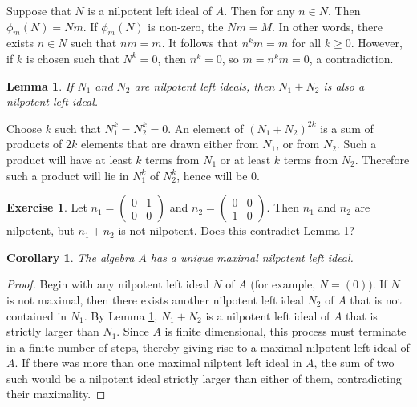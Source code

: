 \documentclass[
]{book}
\newtheorem{lemma}{Lemma}[chapter]
\newtheorem{corollary}{Corollary}[chapter]
\theoremstyle{definition}
\theoremstyle{definition}
\theoremstyle{definition}
\newtheorem{exercise}{Exercise}[chapter]
\theoremstyle{definition}
\theoremstyle{remark}
\begin{document}
Suppose that \(N\) is a nilpotent left ideal of \(A\).
Then for any \(n\in N\).
Then \(\phi_m(N)=Nm\).
If \(\phi_m(N)\) is non-zero, the \(Nm=M\).
In other words, there exists \(n\in N\) such that \(nm=m\).
It follows that \(n^km=m\) for all \(k\geq 0\).
However, if \(k\) is chosen such that \(N^k=0\), then \(n^k=0\), so \(m=n^km=0\), a contradiction.

\begin{lemma}
\protect\hypertarget{lem:sumnil}{}\label{lem:sumnil}If \(N_1\) and \(N_2\) are nilpotent left ideals, then \(N_1+N_2\) is also a nilpotent left ideal.
\end{lemma}

Choose \(k\) such that \(N_1^k=N_2^k=0\).
An element of \((N_1+N_2)^{2k}\) is a sum of products of \(2k\) elements that are drawn either from \(N_1\), or from \(N_2\).
Such a product will have at least \(k\) terms from \(N_1\) or at least \(k\) terms from \(N_2\).
Therefore such a product will lie in \(N_1^k\) of \(N_2^k\), hence will be \(0\).

\begin{exercise}
Let \(n_1=\begin{pmatrix}0&1\\0&0\end{pmatrix}\) and \(n_2=\begin{pmatrix}0&0\\1&0\end{pmatrix}\).
Then \(n_1\) and \(n_2\) are nilpotent, but \(n_1+n_2\) is not nilpotent.
Does this contradict Lemma \ref{lem:sumnil}?
\end{exercise}

\begin{corollary}
The algebra \(A\) has a unique maximal nilpotent left ideal.
\end{corollary}

\begin{proof}
Begin with any nilpotent left ideal \(N\) of \(A\) (for example, \(N=(0)\)).
If \(N\) is not maximal, then there exists another nilpotent left ideal \(N_2\) of \(A\) that is not contained in \(N_1\).
By Lemma \ref{lem:sumnil}, \(N_1+N_2\) is a nilpotent left ideal of \(A\) that is strictly larger than \(N_1\).
Since \(A\) is finite dimensional, this process must terminate in a finite number of steps, thereby giving rise to a maximal nilpotent left ideal of \(A\).
If there was more than one maximal nilptent left ideal in \(A\), the sum of two such would be a nilpotent ideal strictly larger than either of them, contradicting their maximality.
\end{proof}
\end{document}
